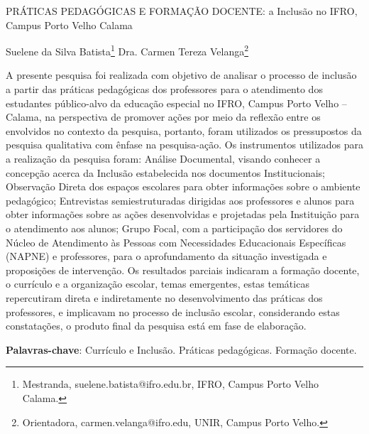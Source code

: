 \documentclass[article,12pt,onesidea,4paper,english,brazil]{abntex2}
\begin{document}
	
	
	\frenchspacing 
	
	\begin{center}
		\LARGE PRÁTICAS PEDAGÓGICAS E FORMAÇÃO DOCENTE: a Inclusão no IFRO, Campus Porto Velho Calama
		
		\normalsize
		Suelene da Silva Batista\footnote{Mestranda, suelene.batista@ifro.edu.br, IFRO, Campus Porto Velho Calama.} 
		Dra. Carmen Tereza Velanga\footnote{Orientadora, carmen.velanga@ifro.edu, UNIR, Campus Porto Velho.} 
	\end{center}
	
	\noindent A presente pesquisa foi realizada com objetivo de analisar o processo de inclusão a
	partir das práticas pedagógicas dos professores para o atendimento dos estudantes
	público-alvo da educação especial no IFRO, Campus Porto Velho – Calama, na
	perspectiva de promover ações por meio da reflexão entre os envolvidos no contexto
	da pesquisa, portanto, foram utilizados os pressupostos da pesquisa qualitativa com
	ênfase na pesquisa-ação. Os instrumentos utilizados para a realização da pesquisa
	foram: Análise Documental, visando conhecer a concepção acerca da Inclusão
	estabelecida nos documentos Institucionais; Observação Direta dos espaços
	escolares para obter informações sobre o ambiente pedagógico; Entrevistas
	semiestruturadas dirigidas aos professores e alunos para obter informações sobre
	as ações desenvolvidas e projetadas pela Instituição para o atendimento aos alunos;
	Grupo Focal, com a participação dos servidores do Núcleo de Atendimento às
	Pessoas com Necessidades Educacionais Específicas (NAPNE) e professores, para
	o aprofundamento da situação investigada e proposições de intervenção. Os
	resultados parciais indicaram a formação docente, o currículo e a organização
	escolar, temas emergentes, estas temáticas repercutiram direta e indiretamente no
	desenvolvimento das práticas dos professores, e implicavam no processo de
	inclusão escolar, considerando estas constatações, o produto final da pesquisa está
	em fase de elaboração.
	
	\vspace{\onelineskip}
	
	\noindent
	\textbf{Palavras-chave}: Currículo e Inclusão. Práticas pedagógicas. Formação docente.
	
\end{document}
